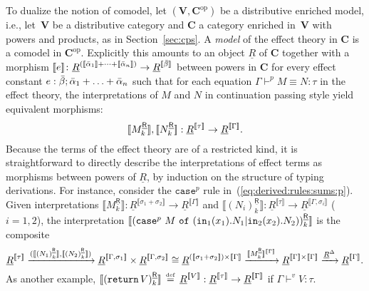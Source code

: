 \documentclass{LMCS}
\newcommand{\hide}[1]{}
\newcommand{\vj}[3]{#1 \mathrel{\vdash^{v}} #2 \colon \! #3}
\newcommand{\peq}[4]{#1 \mathrel{\vdash^p} #2\equiv #3 \colon \! #4}
\newcommand{\return}[1]{\codefont{return} \, #1}
\newcommand{\EECarbret}{\comptype{\mathsf{R}}}
\newcommand{\kvar}k
\newcommand{\codefont}[1]{\mathtt{#1}}
\newcommand{\comptype}[1]{\underline{#1}}
\newcommand{\CBVtoEEC}[1]{#1^{\circ}}
\newcommand{\CBVtoEECbase}[2]{#2^{#1}}
\renewcommand{\vec}[1]{\bar{#1}}
\newcommand{\VCat}{\fixedcatfont{V}} \newcommand{\CCat}{\fixedcatfont{C}} \newcommand{\DCat}{\fixedcatfont{D}}
\newcommand{\lpower}[2]{#2^{#1}}
\newcommand{\fixedcatfont}{\mathbf}
\newcommand{\denlb}{[\![}
\newcommand{\denrb}{]\!]}
\newcommand{\den}[1]{\denlb{#1}\denrb}
\newcommand{\retobj}{\underline{R}}
\newcommand{\opcat}[1]{#1^{\mathrm{op}}}
\newcommand{\defeq}{\mathrel{\,\stackrel{\mbox{\tiny{$\mathrm{def}$}}}=\,}}
\begin{document}
To dualize the notion of comodel, 
let $(\VCat,\opcat\CCat)$ be a distributive enriched model, i.e.,
let~$\VCat$ be a distributive category and $\CCat$ a category enriched
in~$\VCat$ with powers and products, as in Section~\ref{sec:cps}.
A \emph{model} of the effect theory in $\CCat$ 
is a comodel in $\opcat\CCat$.
Explicitly this amounts to an object $\retobj$ of $\CCat$ 
together with a morphism
$\den\geff\colon \lpower{(\den{\vec\alpha_1}+\dots+\den{\vec\alpha_n})}{\retobj}\to \lpower{\den{\vec\beta}}{\retobj}$
between powers in $\CCat$
for every effect constant 
$\arityj{\geff}{\vec\beta}{\vec \alpha_1 + \ldots + \vec \alpha_n}$
such that 
for each equation $\peq\Gamma M N \tau$ in the effect theory,
the interpretations of $M$ and $N$ in continuation
passing style yield equivalent morphisms:
\renewcommand{\CBVtoEEC}{\CBVtoEECbase\EECarbret}\renewcommand{\CBVtoEECV}{\CBVtoEECbase \EECarbret}\renewcommand{\CBVtoEECP}[1]{\CBVtoEECbase \EECarbret{#1}_\kvar}\[
\den{\CBVtoEECP{M}},
\den{\CBVtoEECP{N}}:
\lpower{\den \tau}\retobj\to \lpower {\den{\Gamma}}\retobj\text.\]
\newcommand{\ACat}{\mathbf{A}} \newcommand{\denot}[1]{\llbracket
  #1\rrbracket} \newcommand{\Amodel}{\retobj} \newcommand{\pjc}[3]{#1 \mathrel{\vdash^p_\mathrm{n}} #2 \colon \! #3}Because the terms of the effect theory are of a restricted kind,
it is straightforward to directly describe the interpretations of 
effect terms as morphisms between powers of $\retobj$,
by
induction on the structure of typing derivations.
For instance, consider the $\mathtt{case}^p$ rule in~(\ref{eq:derived:rules:sums:p}).  Given interpretations
${\denot{\CBVtoEECP{M}}\colon \Amodel^{\denot{\sigma_1+\sigma_2}} \to
\Amodel^{\denot{\Gamma}}}$ and $\denot{\CBVtoEECP{(N_i)}}\colon \Amodel^{\denot\tau}
\to \Amodel^{\denot{\Gamma, \sigma_i}}$ (${i=1,2}$), 
the interpretation
$\denot{\CBVtoEECP{(\cbvcasep M {x_1} {N_1} {x_2} {N_2})}}$ is the composite
\[
\Amodel^{\denot\tau}
\xrightarrow{(\denot{\CBVtoEECP{(N_1)}},\denot{\CBVtoEECP{(N_2)}})}
\Amodel^{\denot{\Gamma,\sigma_1}}
\times 
\Amodel^{\denot{\Gamma,\sigma_2}}
\cong
\Amodel^{(\denot{\sigma_1+\sigma_2})\times \denot\Gamma}
\xrightarrow{\denot{\CBVtoEECP{M}}^{\denot{\Gamma}}}
\Amodel^{\denot\Gamma\times\denot\Gamma}
\xrightarrow{\Amodel^\Delta}
\Amodel^{\denot\Gamma}\text.
\]
As another example, 
$\denot{\CBVtoEECP{(\return V)}} \defeq \Amodel^{\denot{V}}:
\Amodel^{\denot\tau}\to\Amodel^{\denot\Gamma}$
if $\vj \Gamma V \tau$.
\hide{A model of an effect theory in $\ACat$ is a model 
of the effect signature such that 
every effect equation 
${\Gamma\vdash M\equiv N\colon \tau}$
in the theory is satisfied, i.e.
$\den M=\den N$.}
\end{document}
